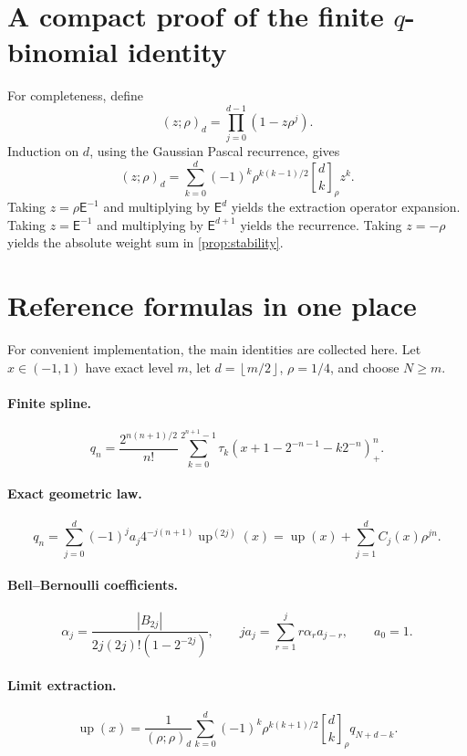 \documentclass[11pt,oneside]{article}
\theoremstyle{definition}
\theoremstyle{remark}
\newcommand{\up}{\operatorname{up}}
\newcommand{\E}{\mathsf E}
\newcommand{\pos}[1]{\left(#1\right)_{+}}
\newcommand{\qbinom}[3]{\genfrac{[}{]}{0pt}{}{#1}{#2}_{#3}}
\newcommand{\abs}[1]{\left\lvert#1\right\rvert}
\newcommand{\floor}[1]{\left\lfloor#1\right\rfloor}
\begin{document}
\section{A compact proof of the finite \texorpdfstring{$q$}{q}-binomial identity}

For completeness, define
\[
 (z;\rho)_d=\prod_{j=0}^{d-1}(1-z\rho^j).
\]
Induction on \(d\), using the Gaussian Pascal recurrence, gives
\begin{equation}\label{eq:finite-qbinomial-appendix}
 (z;\rho)_d
 =\sum_{k=0}^{d}(-1)^k\rho^{k(k-1)/2}
 \qbinom{d}{k}{\rho}z^k.
\end{equation}
Taking \(z=\rho\E^{-1}\) and multiplying by \(\E^d\) yields the extraction
operator expansion.  Taking \(z=\E^{-1}\) and multiplying by
\(\E^{d+1}\) yields the recurrence.  Taking \(z=-\rho\) yields the absolute
weight sum in \cref{prop:stability}.

\section{Reference formulas in one place}

For convenient implementation, the main identities are collected here.
Let \(x\in(-1,1)\) have exact level \(m\), let
\(d=\floor{m/2}\), \(\rho=1/4\), and choose \(N\ge m\).

\paragraph{Finite spline.}
\[
 q_n=\frac{2^{n(n+1)/2}}{n!}
 \sum_{k=0}^{2^{n+1}-1}\tau_k
 \pos{x+1-2^{-n-1}-k2^{-n}}^n.
\]

\paragraph{Exact geometric law.}
\[
 q_n=\sum_{j=0}^{d}(-1)^ja_j4^{-j(n+1)}\up^{(2j)}(x)
 =\up(x)+\sum_{j=1}^{d}C_j(x)\rho^{jn}.
\]

\paragraph{Bell--Bernoulli coefficients.}
\[
 \alpha_j=\frac{\abs{B_{2j}}}{2j(2j)!(1-2^{-2j})},
 \qquad
 ja_j=\sum_{r=1}^{j}r\alpha_ra_{j-r},
 \qquad a_0=1.
\]

\paragraph{Limit extraction.}
\[
 \up(x)=\frac1{(\rho;\rho)_d}
 \sum_{k=0}^{d}(-1)^k\rho^{k(k+1)/2}
 \qbinom{d}{k}{\rho}q_{N+d-k}.
\]
\end{document}
